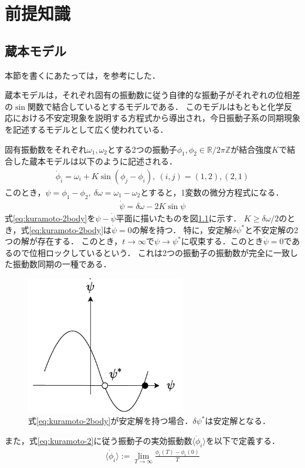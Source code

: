 \documentclass[../main]{subfiles}
\begin{document}
\chapter{前提知識}
\label{chap:prev}
\section{蔵本モデル}
本節を書くにあたっては，\cite{RODRIGUES20161,biorhythm}を参考にした．

蔵本モデルは，それぞれ固有の振動数に従う自律的な振動子がそれぞれの位相差の$\sin$関数で結合しているとするモデルである．
このモデルはもともと化学反応における不安定現象を説明する方程式から導出され\cite{kuramoto1975}，今日振動子系の同期現象を記述するモデルとして広く使われている．

固有振動数をそれぞれ$\omega_1,\omega_2$とする2つの振動子$\phi_1,\phi_2\in\mathbb{R}/2\pi\mathbb{Z}$が結合強度$K$で結合した蔵本モデルは以下のように記述される．
\begin{align}
    \label{eq:kuramoto-2}
    \dot{\phi}_i=\omega_i+K\sin(\phi_j-\phi_i),\ (i,j)=(1,2),(2,1)
\end{align}
このとき，$\psi=\phi_1-\phi_2,\ \delta\omega=\omega_1-\omega_2$とすると，1変数の微分方程式になる．
\begin{align}
    \label{eq:kuramoto-2body}
    \dot{\psi}=\delta\omega-2K\sin\psi  
\end{align}
式\eqref{eq:kuramoto-2body}を$\psi-\dot{\psi}$平面に描いたものを図\ref{fig:kuramoto-2}に示す．
$K\geq\delta\omega/2$のとき，式\eqref{eq:kuramoto-2body}は$\dot{\psi}=0$の解を持つ．
特に，安定解$\delta\psi^\ast$と不安定解の2つの解が存在する．
このとき，$t\to\infty$で$\psi\to\psi^\ast$に収束する．このとき$\dot{\psi}=0$であるので位相ロックしているという．
これは2つの振動子の振動数が完全に一致した振動数同期の一種である．\\
\begin{figure}[t]
\centering
\includegraphics[width=70mm]{images/kuramoto-2.pdf}
\centering
\caption{式\eqref{eq:kuramoto-2body}が安定解を持つ場合．$\delta\psi^\ast$は安定解となる．}
\label{fig:kuramoto-2}
\end{figure}
また，式\eqref{eq:kuramoto-2}に従う振動子の実効振動数$\langle\dot{\phi}_i\rangle$を以下で定義する．
\begin{align*}
    \langle\dot{\phi}_i\rangle:=\lim_{T\to\infty}\frac{\phi_i(T)-\phi_i(0)}{T}
\end{align*}
\end{document}
